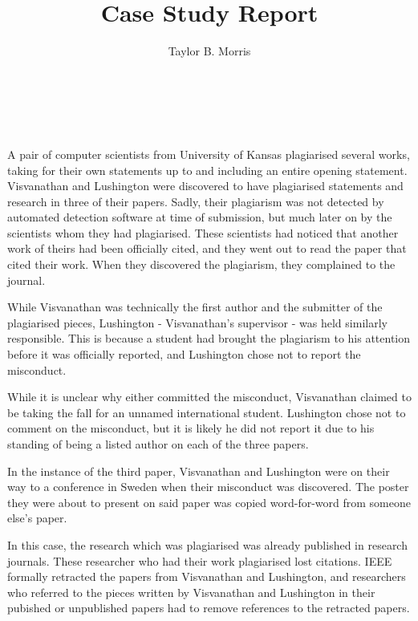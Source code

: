 \documentclass[12pt, letterpaper]{report}
\author{Taylor B. Morris}
\title{Case Study Report}
\begin{document}
\makeatletter
{\huge\noindent\@title\large\\\@author\\\@date}
\makeatother

A pair of computer scientists from University of Kansas plagiarised several
works, taking for their own statements up to and including an entire opening
statement. Visvanathan and Lushington were discovered to have plagiarised
statements and research in three of their papers. Sadly, their plagiarism
was not detected by automated detection software at time of submission, but
much later on by the scientists whom they had plagiarised. These scientists
had noticed that another work of theirs had been officially cited, and they
went out to read the paper that cited their work. When they discovered the
plagiarism, they complained to the journal.

While Visvanathan was technically the first author and the submitter of the
plagiarised pieces, Lushington - Visvanathan's supervisor - was held
similarly responsible. This is because a student had brought the plagiarism
to his attention before it was officially reported, and Lushington chose not
to report the misconduct. 

While it is unclear why either committed the misconduct, Visvanathan claimed
to be taking the fall for an unnamed international student. Lushington chose
not to comment on the misconduct, but it is likely he did not report it due
to his standing of being a listed author on each of the three papers.

In the instance of the third paper, Visvanathan and Lushington were on their
way to a conference in Sweden when their misconduct was discovered. The
poster they were about to present on said paper was copied word-for-word
from someone else's paper. 

In this case, the research which was plagiarised was already published in
research journals. These researcher who had their work plagiarised lost
citations. IEEE formally retracted the papers from Visvanathan and
Lushington, and researchers who referred to the pieces written by 
Visvanathan and Lushington in their pubished or unpublished papers had to remove references to the retracted papers.
\end{document}
